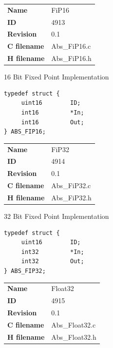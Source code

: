 \ifdefined \AddTestReports
{}
\fi
{}
\nopagebreak[0]
\begin{tabular}{l l}
\textbf{Name} & FiP16 \tabularnewline
\textbf{ID} & 4913 \tabularnewline
\textbf{Revision} & 0.1 \tabularnewline
\textbf{C filename} & Abs\_FiP16.c \tabularnewline
\textbf{H filename} & Abs\_FiP16.h \tabularnewline
\end{tabular}
\vspace{1ex}

16 Bit Fixed Point Implementation

\begin{lstlisting}
typedef struct {
     uint16        ID;
     int16         *In;
     int16         Out;
} ABS_FIP16;
\end{lstlisting}

\ifdefined \AddTestReports
{}
\fi
{}
\nopagebreak[0]
\begin{tabular}{l l}
\textbf{Name} & FiP32 \tabularnewline
\textbf{ID} & 4914 \tabularnewline
\textbf{Revision} & 0.1 \tabularnewline
\textbf{C filename} & Abs\_FiP32.c \tabularnewline
\textbf{H filename} & Abs\_FiP32.h \tabularnewline
\end{tabular}
\vspace{1ex}

32 Bit Fixed Point Implementation

\begin{lstlisting}
typedef struct {
     uint16        ID;
     int32         *In;
     int32         Out;
} ABS_FIP32;
\end{lstlisting}

\ifdefined \AddTestReports
{}
\fi
{}
\nopagebreak[0]
\begin{tabular}{l l}
\textbf{Name} & Float32 \tabularnewline
\textbf{ID} & 4915 \tabularnewline
\textbf{Revision} & 0.1 \tabularnewline
\textbf{C filename} & Abs\_Float32.c \tabularnewline
\textbf{H filename} & Abs\_Float32.h \tabularnewline
\end{tabular}
\vspace{1ex}

